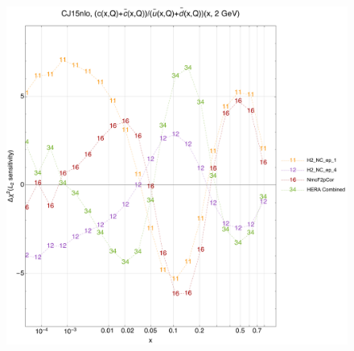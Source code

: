 \documentclass[10pt,aps,prd,floatfix,titlepage]{revtex4}
\begin{document}
\begin{figure}
\includegraphics[width=\textwidth,height=0.44\textheight,keepaspectratio]{2/rat_ifl7_CJ15nlo_L2_q2_Sf_2.pdf}
\caption{}
\end{figure}
\clearpage
\end{document}
